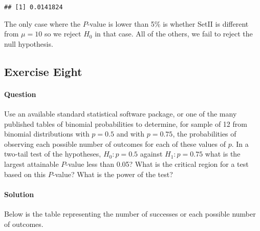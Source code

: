 \documentclass[]{article}
\let\oldparagraph\paragraph
\renewcommand{\paragraph}[1]{\oldparagraph{#1}\mbox{}}
\begin{document}
\begin{verbatim}
## [1] 0.0141824
\end{verbatim}

The only case where the \(P\)-value is lower than 5\% is whether SetII
is different from \(\mu = 10\) so we reject \(H_0\) in that case. All of
the others, we fail to reject the null hypothesis.

\pagebreak

\subsection{Exercise Eight}\label{exercise-eight}

\paragraph{Question}\label{question-7}

Use an available standard statistical software package, or one of the
many published tables of binomial probabilities to determine, for sample
of 12 from binomial distributions with \(p = 0.5\) and with
\(p = 0.75\), the probabilities of observing each possible number of
outcomes for each of these values of \(p\). In a two-tail test of the
hypotheses, \(H_0: p = 0.5\) against \(H_1: p = 0.75\) what is the
largest attainable \(P\)-value less than 0.05? What is the critical
region for a test based on this \(P\)-value? What is the power of the
test?

\paragraph{Solution}\label{solution-7}

Below is the table representing the number of successes or each possible
number of outcomes.
\end{document}
